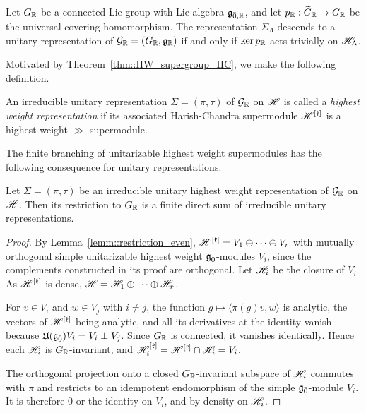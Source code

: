 \begin{remark}
Let $G_{{\mathbb R}}$ be a connected Lie group with Lie algebra ${\mathfrak{g}}_{\bar0,{\mathbb R}}$, and let $p_{{\mathbb R}}:\widetilde G_{{\mathbb R}}\to G_{{\mathbb R}}$ be the universal covering homomorphism. The representation $\Sigma_{\Lambda}$ descends to a unitary representation of ${\mathcal{G}}_{{\mathbb R}}=(G_{{\mathbb R}},{\mathfrak{g}}_{{\mathbb R}})$ if and only if $\ker p_{{\mathbb R}}$ acts trivially on ${\mathscr{H}}_{\Lambda}$.
\end{remark}

Motivated by Theorem~\ref{thm::HW_supergroup_HC}, we make the following definition.

\begin{definition}
An irreducible unitary representation $\Sigma=(\pi,\tau)$ of ${\mathcal{G}}_{{\mathbb R}}$ on ${\mathscr{H}}$ is called a \emph{highest weight representation} if its associated Harish-Chandra supermodule ${\mathscr{H}}^{[{\mathfrak k}]}$ is a highest weight $\gg$-supermodule.
\end{definition}

The finite branching of unitarizable highest weight supermodules has the following consequence for unitary representations.

\begin{corollary}\label{cor::finite_decomposition_group_level}
Let $\Sigma=(\pi,\tau)$ be an irreducible unitary highest weight representation of ${\mathcal{G}}_{{\mathbb R}}$ on ${\mathscr{H}}$. Then its restriction to $G_{{\mathbb R}}$ is a finite direct sum of irreducible unitary representations.
\end{corollary}

\begin{proof}
By Lemma~\ref{lemm::restriction_even}, ${\mathscr{H}}^{[{\mathfrak k}]}=V_1\oplus\cdots\oplus V_r$ with mutually orthogonal simple unitarizable highest weight ${\mathfrak{g}_{\bar{0}}}$-modules $V_i$, since the complements constructed in its proof are orthogonal. Let ${\mathscr{H}}_i$ be the closure of $V_i$. As ${\mathscr{H}}^{[{\mathfrak k}]}$ is dense, ${\mathscr{H}}={\mathscr{H}}_1\oplus\cdots\oplus{\mathscr{H}}_r$.

For $v\in V_i$ and $w\in V_j$ with $i\neq j$, the function $g\mapsto\langle\pi(g)v,w\rangle$ is analytic, the vectors of ${\mathscr{H}}^{[{\mathfrak k}]}$ being analytic, and all its derivatives at the identity vanish because ${\mathfrak U}({\mathfrak{g}_{\bar{0}}})V_i=V_i\perp V_j$. Since $G_{{\mathbb R}}$ is connected, it vanishes identically. Hence each ${\mathscr{H}}_i$ is $G_{{\mathbb R}}$-invariant, and ${\mathscr{H}}_i^{[{\mathfrak k}]}={\mathscr{H}}^{[{\mathfrak k}]}\cap{\mathscr{H}}_i=V_i$.

The orthogonal projection onto a closed $G_{{\mathbb R}}$-invariant subspace of ${\mathscr{H}}_i$ commutes with $\pi$ and restricts to an idempotent endomorphism of the simple ${\mathfrak{g}_{\bar{0}}}$-module $V_i$. It is therefore $0$ or the identity on $V_i$, and by density on ${\mathscr{H}}_i$.
\end{proof}

